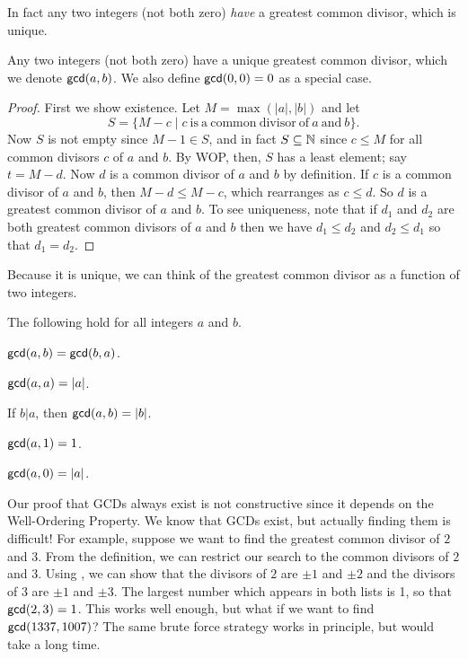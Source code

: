 In fact any two integers (not both zero) \emph{have} a greatest common divisor, which is unique.

\begin{prop}\label{prop:zz-gcds-exist}
Any two integers (not both zero) have a unique greatest common divisor, which we denote \(\mathsf{gcd}(a, b)\).
We also define \(\mathsf{gcd}(0, 0) = 0\) as a special case.
\end{prop}

\begin{proof}
First we show existence.
Let \(M = \max(|a|,|b|)\) and let \[ S = \{ M - c \mid c\ \mathrm{is\ a\ common\ divisor\ of}\ a\ \mathrm{and}\ b \}. \]
Now \(S\) is not empty since \(M - 1 \in S\), and in fact \(S \subseteq \mathbb{N}\) since \(c \leq M\) for all common divisors \(c\) of \(a\) and \(b\).
By WOP, then, \(S\) has a least element; say \(t = M - d\).
Now \(d\) is a common divisor of \(a\) and \(b\) by definition.
If \(c\) is a common divisor of \(a\) and \(b\), then \(M - d \leq M - c\), which rearranges as \(c \leq d\).
So \(d\) is a greatest common divisor of \(a\) and \(b\).
To see uniqueness, note that if \(d_1\) and \(d_2\) are both greatest common divisors of \(a\) and \(b\) then we have \(d_1 \leq d_2\) and \(d_2 \leq d_1\) so that \(d_1 = d_2\).
\end{proof}

Because it is unique, we can think of the greatest common divisor as a function of two integers.

\begin{prop}
The following hold for all integers \(a\) and \(b\).
\begin{proplist*}
\item \(\mathsf{gcd}(a, b) = \mathsf{gcd}(b, a)\).
\item \(\mathsf{gcd}(a, a) = |a|\).
\item If \(b|a\), then \(\mathsf{gcd}(a, b) = |b|\).
\item \(\mathsf{gcd}(a, 1) = 1\).
\item \(\mathsf{gcd}(a, 0) = |a|\).
\end{proplist*}
\end{prop}

Our proof that GCDs always exist is not constructive since it depends on the Well-Ordering Property.
We know that GCDs exist, but actually finding them is difficult!
For example, suppose we want to find the greatest common divisor of \(2\) and \(3\).
From the definition, we can restrict our search to the common divisors of \(2\) and \(3\).
Using , we can show that the divisors of \(2\) are \(\pm 1\) and \(\pm 2\) and the divisors of \(3\) are \(\pm 1\) and \(\pm 3\).
The largest number which appears in both lists is 1, so that \(\mathsf{gcd}(2, 3) = 1\).
This works well enough, but what if we want to find \(\mathsf{gcd}(1337, 1007)\)?
The same brute force strategy works in principle, but would take a long time.

